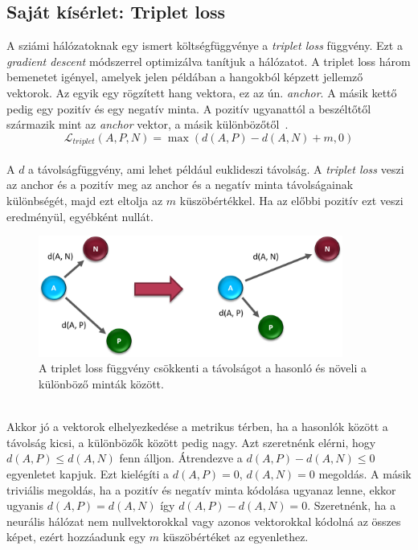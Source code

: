 \newpage

\subsection{Saját kísérlet: Triplet loss}


A sziámi hálózatoknak egy ismert költségfüggvénye a \emph{triplet loss} függvény. Ezt a \emph{gradient descent} módszerrel optimizálva tanítjuk a hálózatot. A triplet loss három bemenetet igényel, amelyek jelen példában a hangokból képzett jellemző vektorok. Az egyik egy rögzített hang vektora, ez az ún. \emph{anchor}. A másik kettő pedig egy pozitív és egy negatív minta. A pozitív ugyanattól a beszéltőtől származik mint az \emph{anchor} vektor, a másik különbözőtől~\cite{triplet_semi_hard}.
\begin{equation}\label{eq:4}
\mathcal{L}_{triplet}(A, P, N) = \max(d(A, P) - d(A, N) + m, 0)
\end{equation}
\ \\
A $d$ a távolságfüggvény, ami lehet például euklideszi távolság. A \emph{triplet loss} veszi az anchor és a pozitív meg az anchor és a negatív minta távolságainak különbségét, majd ezt eltolja az $m$ küszöbértékkel. Ha az előbbi pozitív ezt veszi eredményül, egyébként nullát.

\begin{figure}[!ht]
	\centering
	\includegraphics[width=100mm, keepaspectratio]{figures/triplet-loss.png}
	\caption{A triplet loss függvény csökkenti a távolságot a hasonló és növeli a különböző minták között.}
	\label{fig:triplet-loss}
\end{figure}
\ \\
Akkor jó a vektorok elhelyezkedése a metrikus térben, ha a hasonlók között a távolság kicsi, a különbözők között pedig nagy. Azt szeretnénk elérni, hogy
$d(A, P) \le d(A, N)$ fenn álljon. Átrendezve a $d(A, P) - d(A, N) \le 0$ egyenletet kapjuk. Ezt kielégíti a $d(A, P) = 0$, $d(A, N) = 0$ megoldás. A másik triviális megoldás, ha a pozitív és negatív minta kódolása ugyanaz lenne, ekkor ugyanis $d(A, P) = d(A, N)$ így $d(A, P) - d(A, N) = 0$. Szeretnénk, ha a neurális hálózat nem nullvektorokkal vagy azonos vektorokkal kódolná az összes képet, ezért hozzáadunk egy $m$ küszöbértéket az egyenlethez.

